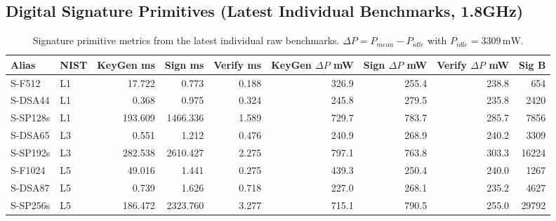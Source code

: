 \subsection{Digital Signature Primitives (Latest Individual Benchmarks, 1.8GHz)}
\begin{table}[t]
\centering
\caption{Signature primitive metrics from the latest individual raw benchmarks. $\Delta P = P_{mean}-P_{idle}$ with $P_{idle}=3309\,\mathrm{mW}$.}
\footnotesize
\setlength{\tabcolsep}{3pt}
\begin{tabular}{@{}llrrrrrrr@{}}\toprule
Alias & NIST & KeyGen ms & Sign ms & Verify ms & KeyGen $\Delta P$ mW & Sign $\Delta P$ mW & Verify $\Delta P$ mW & Sig B \\ \midrule
S-F512 & L1 & 17.722 & 0.773 & 0.188 & 326.9 & 255.4 & 238.8 & 654 \\
S-DSA44 & L1 & 0.368 & 0.975 & 0.324 & 245.8 & 279.5 & 235.8 & 2420 \\
S-SP128s & L1 & 193.609 & 1466.336 & 1.589 & 729.7 & 783.7 & 285.7 & 7856 \\
S-DSA65 & L3 & 0.551 & 1.212 & 0.476 & 240.9 & 268.9 & 240.2 & 3309 \\
S-SP192s & L3 & 282.538 & 2610.427 & 2.275 & 797.1 & 763.8 & 303.3 & 16224 \\
S-F1024 & L5 & 49.016 & 1.441 & 0.275 & 439.3 & 250.4 & 240.0 & 1267 \\
S-DSA87 & L5 & 0.739 & 1.626 & 0.718 & 227.0 & 268.1 & 235.2 & 4627 \\
S-SP256s & L5 & 186.472 & 2323.760 & 3.277 & 715.1 & 790.5 & 255.0 & 29792 \\
\bottomrule\end{tabular}
\label{tab:sig-primitives-latest-manual}
\end{table}

